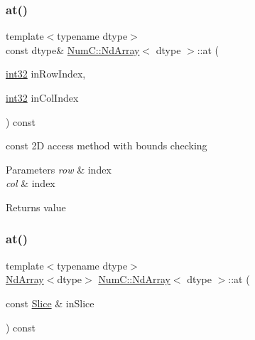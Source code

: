 \subsubsection{\texorpdfstring{at()}{at()}\hspace{0.1cm}{\footnotesize\ttfamily [4/8]}}
{\footnotesize\ttfamily template$<$typename dtype$>$ \\
const dtype\& \mbox{\hyperlink{class_num_c_1_1_nd_array}{Num\+C\+::\+Nd\+Array}}$<$ dtype $>$\+::at (\begin{DoxyParamCaption}\item[{\mbox{\hyperlink{namespace_num_c_aa5a7e69266097d55816d4cdb19542b53}{int32}}}]{in\+Row\+Index,  }\item[{\mbox{\hyperlink{namespace_num_c_aa5a7e69266097d55816d4cdb19542b53}{int32}}}]{in\+Col\+Index }\end{DoxyParamCaption}) const\hspace{0.3cm}{\ttfamily [inline]}}

const 2D access method with bounds checking


\begin{DoxyParams}{Parameters}
{\em row} & index \\
\hline
{\em col} & index \\
\hline
\end{DoxyParams}
\begin{DoxyReturn}{Returns}
value 
\end{DoxyReturn}
\mbox{\label{class_num_c_1_1_nd_array_a2be747f5c745a8a70fc1e036c912ec4a}} 
\subsubsection{\texorpdfstring{at()}{at()}\hspace{0.1cm}{\footnotesize\ttfamily [5/8]}}
{\footnotesize\ttfamily template$<$typename dtype$>$ \\
\mbox{\hyperlink{class_num_c_1_1_nd_array}{Nd\+Array}}$<$dtype$>$ \mbox{\hyperlink{class_num_c_1_1_nd_array}{Num\+C\+::\+Nd\+Array}}$<$ dtype $>$\+::at (\begin{DoxyParamCaption}\item[{const \mbox{\hyperlink{class_num_c_1_1_slice}{Slice}} \&}]{in\+Slice }\end{DoxyParamCaption}) const\hspace{0.3cm}{\ttfamily [inline]}}

